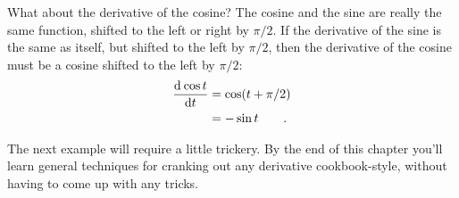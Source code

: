 \begin{eg}\label{eg:dcos}
What about the derivative of the cosine? The cosine and the sine are really the same function, shifted to the left or right by
$\pi/2$. If the derivative of the sine is the same as itself, but shifted to the left by $\pi/2$, then the derivative of
the cosine must be a cosine shifted to the left by $\pi/2$:
\begin{align*}
  \frac{\operatorname{d\!}\: \cos t}{\operatorname{d\!} t} &= \cos(t+\pi/2) \\
                               &= -\sin t \qquad .
\end{align*}
\end{eg}
The next example will require a little trickery.
By the end of this chapter you'll learn general techniques for
cranking out any derivative cookbook-style, without having to come
up with any tricks.


